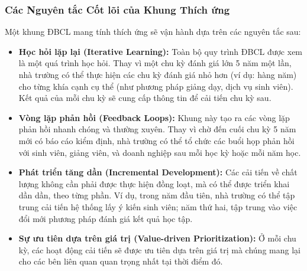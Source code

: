 \documentclass[12pt, a4paper, openany]{report}
\begin{document}
\subsubsection{Các Nguyên tắc Cốt lõi của Khung Thích ứng}
Một khung ĐBCL mang tính thích ứng sẽ vận hành dựa trên các nguyên tắc sau:
\begin{itemize}
    \item \textbf{Học hỏi lặp lại (Iterative Learning):} Toàn bộ quy trình ĐBCL được xem là một quá trình học hỏi. Thay vì một chu kỳ đánh giá lớn 5 năm một lần, nhà trường có thể thực hiện các chu kỳ đánh giá nhỏ hơn (ví dụ: hàng năm) cho từng khía cạnh cụ thể (như phương pháp giảng dạy, dịch vụ sinh viên). Kết quả của mỗi chu kỳ sẽ cung cấp thông tin để cải tiến chu kỳ sau.
    \item \textbf{Vòng lặp phản hồi (Feedback Loops):} Khung này tạo ra các vòng lặp phản hồi nhanh chóng và thường xuyên. Thay vì chờ đến cuối chu kỳ 5 năm mới có báo cáo kiểm định, nhà trường có thể tổ chức các buổi họp phản hồi với sinh viên, giảng viên, và doanh nghiệp sau mỗi học kỳ hoặc mỗi năm học.
    \item \textbf{Phát triển tăng dần (Incremental Development):} Các cải tiến về chất lượng không cần phải được thực hiện đồng loạt, mà có thể được triển khai dần dần, theo từng phần. Ví dụ, trong năm đầu tiên, nhà trường có thể tập trung cải tiến hệ thống lấy ý kiến sinh viên; năm thứ hai, tập trung vào việc đổi mới phương pháp đánh giá kết quả học tập.
    \item \textbf{Sự ưu tiên dựa trên giá trị (Value-driven Prioritization):} Ở mỗi chu kỳ, các hoạt động cải tiến sẽ được ưu tiên dựa trên giá trị mà chúng mang lại cho các bên liên quan quan trọng nhất tại thời điểm đó.
\end{itemize}
\end{document}
